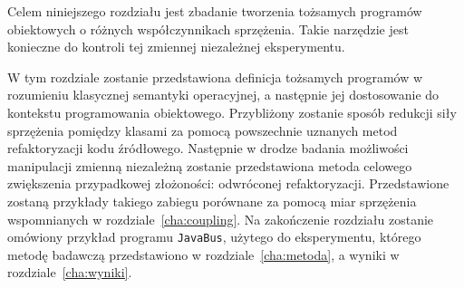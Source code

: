 Celem niniejszego rozdziału jest zbadanie tworzenia tożsamych programów obiektowych o różnych współczynnikach sprzężenia.
Takie narzędzie jest konieczne do kontroli tej zmiennej niezależnej eksperymentu.

W tym rozdziale zostanie przedstawiona definicja tożsamych programów w rozumieniu klasycznej semantyki operacyjnej,
a następnie jej dostosowanie do kontekstu programowania obiektowego.
Przybliżony zostanie sposób redukcji siły sprzężenia pomiędzy klasami za pomocą powszechnie uznanych metod
refaktoryzacji kodu źródłowego.
Następnie w drodze badania możliwości manipulacji zmienną niezależną zostanie przedstawiona metoda celowego zwiększenia
przypadkowej złożoności: odwróconej refaktoryzacji.
Przedstawione zostaną przykłady takiego zabiegu porównane za pomocą miar sprzężenia wspomnianych w rozdziale~\ref{cha:coupling}.
Na zakończenie rozdziału zostanie omówiony przykład programu \texttt{JavaBus}, użytego do eksperymentu, którego
metodę badawczą przedstawiono w rozdziale~\ref{cha:metoda}, a wyniki w rozdziale~\ref{cha:wyniki}.

